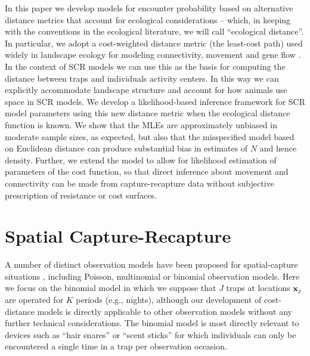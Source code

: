 \documentclass[12pt]{article}
\begin{document}
\begin{spacing}{1.8}
In this paper we develop models for encounter probability based on
alternative distance metrics that account for ecological
considerations -- which, in keeping with the conventions in the
ecological literature, we will call ``ecological distance''. In
particular, we adopt a cost-weighted distance metric (the least-cost path)
used widely in landscape ecology for modeling connectivity,
movement and gene flow
\citep{adriaensen_etal:2003}. In the
context of SCR models we can use this as the basis for computing the
distance between traps and individuals activity centers. In this way
we can explicitly accommodate landscape structure and
account for how animals use space in SCR models. We develop a
likelihood-based inference framework for SCR model parameters using
this new distance metric when the ecological distance function is
known.  We show that the MLEs are approximately unbiased in moderate
sample sizes, as expected, but also that the misspecified model based
on Euclidean distance can produce substantial bias in estimates of $N$
and hence density.  Further, we extend the model to allow for likelihood
estimation of parameters of the cost function, so that direct inference
about movement and connectivity can be made from capture-recapture data without subjective prescription
of resistance or cost surfaces.


\section{Spatial Capture-Recapture}

A number of distinct observation models have been proposed for
spatial-capture situations \citep{borchers_efford:2008,
  royle_etal:2009ecol, efford_etal:2009ecol}, including Poisson,
multinomial or binomial observation models. 
Here we focus on the binomial model in which we
suppose that $J$ traps at locations ${\bf x}_{j}$ are operated for $K$
periods (e.g., nights), although our development of cost-distance
models is directly applicable to other observation models without any
further technical considerations. The binomial model is most directly
relevant to devices such as ``hair snares''
\citep{woods_etal:1999,gardner_etal:2010jwm} or ``scent sticks''
\citep{kery_etal:2010} for which individuals can only be encountered a
single time in a trap per observation occasion.


\end{spacing}
\end{document}
